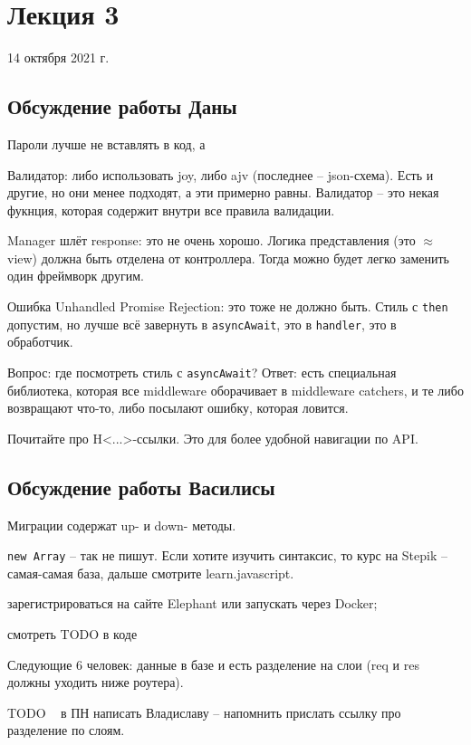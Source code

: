 \documentclass[main.tex]{subfiles}
\begin{document}
\section{Лекция 3}
14 октября 2021 г.

\subsection{Обсуждение работы Даны}

Пароли лучше не вставлять в код, а 

Валидатор: либо использовать joy, либо ajv (последнее -- json-схема).
Есть и другие, но они менее подходят, а эти примерно равны.
Валидатор -- это некая фукнция, которая содержит внутри все правила валидации.

Manager шлёт response: это не очень хорошо.
Логика представления (это $\approx$view) должна быть отделена от контроллера.
Тогда можно будет легко заменить один фреймворк другим.

Ошибка Unhandled Promise Rejection: это тоже не должно быть.
Стиль с \texttt{then} допустим, но лучше всё завернуть в \texttt{asyncAwait}, это в \texttt{handler}, это в обработчик.

Вопрос: где посмотреть стиль с \texttt{asyncAwait}?
Ответ: есть специальная библиотека, которая все middleware оборачивает в middleware catchers, и те либо возвращают что-то, либо посылают ошибку, которая ловится.

Почитайте про H<...>-ссылки.
Это для более удобной навигации по API.

\subsection{Обсуждение работы Василисы}

Миграции содержат up- и down- методы.

\texttt{new Array} -- так не пишут.
Если хотите изучить синтаксис, то курс на Stepik -- самая-самая база, дальше смотрите learn.javascript.

\begin{leftbar}
	зарегистрироваться на сайте Elephant или запускать через Docker;
	
	смотреть TODO в коде
	
	Следующие 6 человек: данные в базе и есть разделение на слои (req и res должны уходить ниже роутера).
	
	TODO ~ в ПН написать Владиславу -- напомнить прислать ссылку про разделение по слоям.
\end{leftbar}
\end{document}
